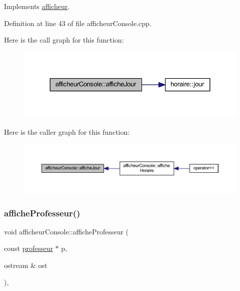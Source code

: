Implements \hyperlink{classafficheur_a0cea335dad556ceba3487ae261b831f9}{afficheur}.



Definition at line 43 of file afficheur\+Console.\+cpp.

Here is the call graph for this function\+:\nopagebreak
\begin{figure}[H]
\begin{center}
\leavevmode
\includegraphics[width=324pt]{classafficheur_console_a9d69206c3cd6409d1437ee546e71cf25_cgraph}
\end{center}
\end{figure}
Here is the caller graph for this function\+:\nopagebreak
\begin{figure}[H]
\begin{center}
\leavevmode
\includegraphics[width=350pt]{classafficheur_console_a9d69206c3cd6409d1437ee546e71cf25_icgraph}
\end{center}
\end{figure}
\hypertarget{classafficheur_console_aa178d74ab314df687800c612a3615ed6}{}\label{classafficheur_console_aa178d74ab314df687800c612a3615ed6} 
\subsubsection{\texorpdfstring{affiche\+Professeur()}{afficheProfesseur()}}
{\footnotesize\ttfamily void afficheur\+Console\+::affiche\+Professeur (\begin{DoxyParamCaption}\item[{const \hyperlink{classprofesseur}{professeur} $\ast$}]{p,  }\item[{ostream \&}]{ost }\end{DoxyParamCaption})\hspace{0.3cm}{\ttfamily [override]}, {\ttfamily [virtual]}}



